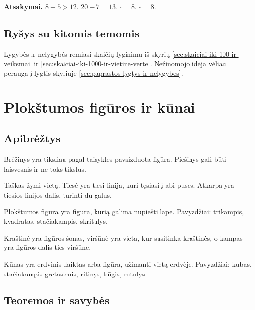 \textbf{Atsakymai.} \(8+5>12\). \(20-7=13\). \(\square=8\). \(\square=8\).

\subsection{Ryšys su kitomis temomis}

Lygybės ir nelygybės remiasi skaičių lyginimu iš skyrių \ref{sec:skaiciai-iki-100-ir-veiksmai} ir \ref{sec:skaiciai-iki-1000-ir-vietine-verte}. Nežinomojo idėja vėliau perauga į lygtis skyriuje \ref{sec:paprastos-lygtys-ir-nelygybes}.

\section{Plokštumos figūros ir kūnai}\label{sec:plokstumos-figuros-ir-kunai}

\subsection{Apibrėžtys}

\begin{apibreztis}
Brėžinys yra tiksliau pagal taisykles pavaizduota figūra. Piešinys gali būti laisvesnis ir ne toks tikslus.
\end{apibreztis}

\begin{apibreztis}
Taškas žymi vietą. Tiesė yra tiesi linija, kuri tęsiasi į abi puses. Atkarpa yra tiesios linijos dalis, turinti du galus.
\end{apibreztis}

\begin{apibreztis}
Plokštumos figūra yra figūra, kurią galima nupiešti lape. Pavyzdžiai: trikampis, kvadratas, stačiakampis, skritulys.
\end{apibreztis}

\begin{apibreztis}
Kraštinė yra figūros šonas, viršūnė yra vieta, kur susitinka kraštinės, o kampas yra figūros dalis ties viršūne.
\end{apibreztis}

\begin{apibreztis}
Kūnas yra erdvinis daiktas arba figūra, užimanti vietą erdvėje. Pavyzdžiai: kubas, stačiakampis gretasienis, ritinys, kūgis, rutulys.
\end{apibreztis}

\subsection{Teoremos ir savybės}

